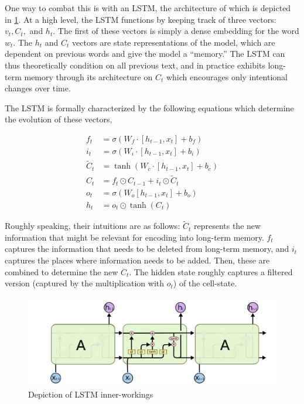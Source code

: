 \documentclass[12pt]{article}
\begin{document}
One way to combat this is with an LSTM, the architecture of which is depicted in
\cref{fig:lstmdiagram}. At a high level, the LSTM functions by keeping track of
three vectors: $v_t, C_t,$ and $h_t$. The first of these vectors is simply a
dense embedding for the word $w_t$. The $h_t$ and $C_t$ vectors are state
representations of the model, which are dependent on previous words and give the
model a ``memory.'' The LSTM can thus theoretically condition on all previous
text, and in practice exhibits long-term memory through its architecture on
$C_t$ which encourages only intentional changes over time.

The LSTM is formally characterized by the following equations which determine
the evolution of these vectors,

\begin{align}
f_t &= \sigma(W_f \cdot [h_{t-1}, x_t] + b_f) \\
i_t &= \sigma(W_i \cdot [h_{t-1}, x_t] + b_i) \\
\tilde C_t &= \tanh(W_c \cdot [h_{t-1}, x_t] + b_c) \\
C_t &= f_t \odot C_{t-1} + i_t \odot \tilde C_t \\
o_t &= \sigma(W_o [h_{t-1}, x_t] + b_o) \\
h_t &= o_t \odot \tanh(C_t)
\end{align}

Roughly speaking, their intuitions are as follows: $\tilde C_t$ represents the
new information that might be relevant for encoding into long-term memory. $f_t$
captures the information that needs to be deleted from long-term memory, and
$i_t$ captures the places where information needs to be added. Then, these are
combined to determine the new $C_t$. The hidden state roughly captures a
filtered version (captured by the multiplication with $o_t$) of the cell-state.

\begin{figure}[htb]
\centering
\includegraphics[width=\textwidth]{figs/lstm-diagram.png}
\caption{Depiction of LSTM inner-workings \citep{olah2015understanding}}
\label{fig:lstmdiagram}
\end{figure}
\end{document}
